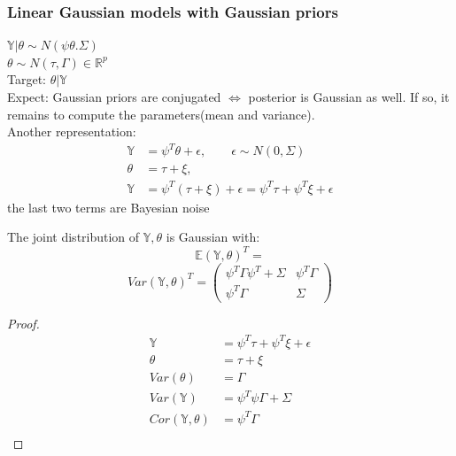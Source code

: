 \subsubsection*{Linear Gaussian models with Gaussian priors}

$\mathbb{Y} | \theta \sim N(\psi\theta. \Sigma)$\\
$\theta \sim N(\tau, \Gamma) \in \mathbb{R}^p$\\
Target: $\theta|\mathbb{Y}$\\
Expect: Gaussian priors are conjugated $\Leftrightarrow$ posterior is Gaussian as well. If so, it remains to compute the parameters(mean and variance).\\
Another representation:
\begin{align*}
	\mathbb{Y} &= \psi^T\theta + \epsilon, \qquad \epsilon \sim N(0, \Sigma)\\
	\theta &= \tau + \xi, \\
	\mathbb{Y} &= \psi^T(\tau + \xi) + \epsilon = \psi^T \tau + \psi^T\xi + \epsilon
\end{align*}
the last two terms are Bayesian noise

\begin{theorem}
	The joint distribution of $\mathbb{Y}, \theta$ is Gaussian with:
	\begin{equation*}
		\mathbb{E}(\mathbb{Y}, \theta)^T = 
	\end{equation*}
	\begin{equation*}
		Var(\mathbb{Y}, \theta)^T = 
		\left(\begin{matrix}
			\psi^T \Gamma \psi^T + \Sigma & \psi^T \Gamma  \\
			 \psi^T \Gamma & \Sigma
		\end{matrix}\right)
	\end{equation*}
\end{theorem}

\begin{proof}
	\begin{align*}
		\mathbb{Y} &= \psi^T \tau + \psi^T\xi + \epsilon\\
		\theta &= \tau + \xi\\
		Var(\theta) &= \Gamma \\
		Var(\mathbb{Y}) &= \psi^T \psi \Gamma + \Sigma  \\ 
		Cor(\mathbb{Y}, \theta) &=  \psi^T \Gamma \\
	\end{align*}
\end{proof}

